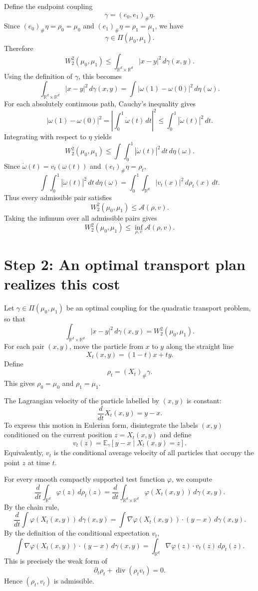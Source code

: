 \documentclass[11pt]{article}
\begin{document}
Define the endpoint coupling
\[
\gamma=(e_0,e_1)_\#\eta.
\]
Since $(e_0)_\#\eta=\rho_0=\mu_0$ and $(e_1)_\#\eta=\rho_1=\mu_1$, we have
\[
\gamma\in \Pi(\mu_0,\mu_1).
\]
Therefore
\[
W_2^2(\mu_0,\mu_1)
\le
\int_{\mathbb R^d\times\mathbb R^d}|x-y|^2\,d\gamma(x,y).
\]
Using the definition of $\gamma$, this becomes
\[
\int_{\mathbb R^d\times\mathbb R^d}|x-y|^2\,d\gamma(x,y)
=
\int |\omega(1)-\omega(0)|^2\,d\eta(\omega).
\]
For each absolutely continuous path, Cauchy's inequality gives
\[
|\omega(1)-\omega(0)|^2
=
\left|\int_0^1 \dot\omega(t)\,dt\right|^2
\le
\int_0^1|\dot\omega(t)|^2\,dt.
\]
Integrating with respect to $\eta$ yields
\[
W_2^2(\mu_0,\mu_1)
\le
\int\int_0^1|\dot\omega(t)|^2\,dt\,d\eta(\omega).
\]
Since $\dot\omega(t)=v_t(\omega(t))$ and $(e_t)_\#\eta=\rho_t$,
\[
\int\int_0^1|\dot\omega(t)|^2\,dt\,d\eta(\omega)
=
\int_0^1\int_{\mathbb R^d}|v_t(x)|^2\,d\rho_t(x)\,dt.
\]
Thus every admissible pair satisfies
\[
W_2^2(\mu_0,\mu_1)
\le
\mathcal A(\rho,v).
\]
Taking the infimum over all admissible pairs gives
\[
W_2^2(\mu_0,\mu_1)
\le
\inf_{\rho,v}\mathcal A(\rho,v).
\]

\section*{Step 2: An optimal transport plan realizes this cost}

Let $\gamma\in\Pi(\mu_0,\mu_1)$ be an optimal coupling for the quadratic
transport problem, so that
\[
\int_{\mathbb R^d\times\mathbb R^d}|x-y|^2\,d\gamma(x,y)
=
W_2^2(\mu_0,\mu_1).
\]
For each pair $(x,y)$, move the particle from $x$ to $y$ along the straight
line
\[
X_t(x,y)=(1-t)x+ty.
\]
Define
\[
\rho_t=(X_t)_\#\gamma.
\]
This gives $\rho_0=\mu_0$ and $\rho_1=\mu_1$.

The Lagrangian velocity of the particle labelled by $(x,y)$ is constant:
\[
\frac{d}{dt}X_t(x,y)=y-x.
\]
To express this motion in Eulerian form, disintegrate the labels $(x,y)$
conditioned on the current position $z=X_t(x,y)$ and define
\[
v_t(z)
=
\mathbb E_\gamma[y-x\mid X_t(x,y)=z].
\]
Equivalently, $v_t$ is the conditional average velocity of all particles that
occupy the point $z$ at time $t$.

For every smooth compactly supported test function $\varphi$, we compute
\[
\frac{d}{dt}\int_{\mathbb R^d}\varphi(z)\,d\rho_t(z)
=
\frac{d}{dt}\int_{\mathbb R^d\times\mathbb R^d}
\varphi(X_t(x,y))\,d\gamma(x,y).
\]
By the chain rule,
\[
\frac{d}{dt}\int \varphi(X_t(x,y))\,d\gamma(x,y)
=
\int \nabla\varphi(X_t(x,y))\cdot (y-x)\,d\gamma(x,y).
\]
By the definition of the conditional expectation $v_t$,
\[
\int \nabla\varphi(X_t(x,y))\cdot (y-x)\,d\gamma(x,y)
=
\int_{\mathbb R^d}\nabla\varphi(z)\cdot v_t(z)\,d\rho_t(z).
\]
This is precisely the weak form of
\[
\partial_t\rho_t+\operatorname{div}(\rho_t v_t)=0.
\]
Hence $(\rho_t,v_t)$ is admissible.
\end{document}
